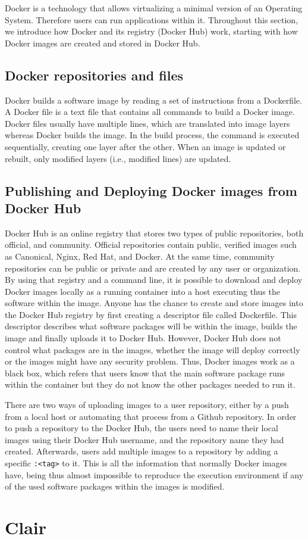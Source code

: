 \label{sec-Docker_overview}
Docker is a technology that allows virtualizing a minimal version of an Operating System. Therefore users can run applications within it. Throughout this section, we introduce how Docker and its registry (Docker Hub) work, starting with how Docker images are created and stored in Docker Hub. 

\subsection{Docker repositories and files}

Docker builds a software image by reading a set of instructions from a Dockerfile. A Docker file is a text file that contains all commands to build a Docker image. Docker files usually have multiple lines, which are translated into image layers whereas Docker builds the image. In the build process, the command is executed sequentially, creating one layer after the other. When an image is updated or rebuilt, only modified layers (i.e., modified lines) are updated. 


\subsection{Publishing and Deploying Docker images from Docker Hub}

Docker Hub is an online registry that stores two types of public repositories, both official, and community. Official repositories contain public, verified images such as Canonical, Nginx, Red Hat, and Docker. At the same time, community repositories can be public or private and are created by any user or organization.
By using that registry and a command line, it is possible to download and deploy Docker images locally as a running container into a host executing thus the software within the image. 
Anyone has the chance to create and store images into the Docker Hub registry by first creating a descriptor file called Dockerfile. 
This descriptor describes what software packages will be within the image, builds the image and finally uploads it to Docker Hub. However, Docker Hub does not control what packages are in the images, whether the image will deploy correctly or the images might have any security problem. 
Thus, Docker images work as a black box, which refers that users know that the main software package runs within the container but they do not know the other packages needed to run it.



There are two ways of uploading images to a user repository, either by a push from a local host or automating that process from a Github repository. In order to push a repository to the Docker Hub, the users need to name their local images using their Docker Hub username, and the repository name they had created. Afterwards, users add multiple images to a repository by adding a specific \texttt{:<tag>} to it. This is all the information that normally Docker images have, being thus almost impossible to reproduce the execution environment if any of the used software packages within the images is modified. 

\section{Clair}